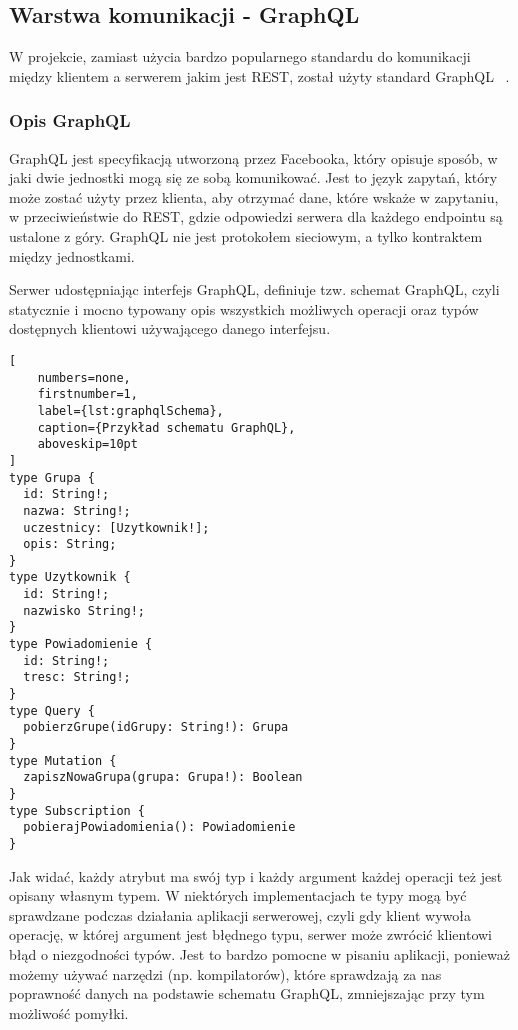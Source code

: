 \subsection{Warstwa komunikacji - GraphQL}
W projekcie, zamiast użycia bardzo popularnego standardu do komunikacji między klientem a serwerem jakim jest REST, został użyty standard GraphQL ~\cite{ref_graphql_doc}.

\subsubsection{Opis GraphQL}
GraphQL jest specyfikacją utworzoną przez Facebooka, który opisuje sposób, w jaki dwie jednostki mogą się ze sobą komunikować. Jest to język zapytań, który może zostać użyty przez klienta, aby otrzymać dane, które wskaże w zapytaniu, w przeciwieństwie do REST, gdzie odpowiedzi serwera dla każdego endpointu są ustalone z góry. GraphQL nie jest protokołem sieciowym, a tylko kontraktem między jednostkami.

Serwer udostępniając interfejs GraphQL, definiuje tzw. schemat GraphQL, czyli statycznie i mocno typowany opis wszystkich możliwych operacji oraz typów dostępnych klientowi używającego danego interfejsu.

\begin{addmargin}[6mm]{0mm}
\begin{lstlisting}[
    numbers=none,
    firstnumber=1,
    label={lst:graphqlSchema},
    caption={Przykład schematu GraphQL},
    aboveskip=10pt
]
type Grupa {
  id: String!;
  nazwa: String!;
  uczestnicy: [Uzytkownik!];
  opis: String;
}
type Uzytkownik {
  id: String!;
  nazwisko String!;
}
type Powiadomienie {
  id: String!;
  tresc: String!;
}
type Query {
  pobierzGrupe(idGrupy: String!): Grupa
}
type Mutation {
  zapiszNowaGrupa(grupa: Grupa!): Boolean
}
type Subscription {
  pobierajPowiadomienia(): Powiadomienie
}
\end{lstlisting}
\end{addmargin}
Jak widać, każdy atrybut ma swój typ i każdy argument każdej operacji też jest opisany własnym typem. W niektórych implementacjach te typy mogą być sprawdzane podczas działania aplikacji serwerowej, czyli gdy klient wywoła operację, w której argument jest błędnego typu, serwer może zwrócić klientowi błąd o niezgodności typów. Jest to bardzo pomocne w pisaniu aplikacji, ponieważ możemy używać narzędzi (np. kompilatorów), które sprawdzają za nas poprawność danych na podstawie schematu GraphQL, zmniejszając przy tym możliwość pomyłki.

